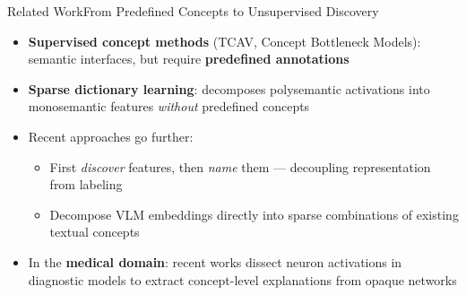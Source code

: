 \begin{frame}{Related Work}{From Predefined Concepts to Unsupervised Discovery}
  \begin{itemize}
    \item \textbf{Supervised concept methods} (TCAV, Concept Bottleneck Models): semantic interfaces, but require \textbf{predefined annotations}
    \item \textbf{Sparse dictionary learning}: decomposes polysemantic activations into monosemantic features \textit{without} predefined concepts
    \item Recent approaches go further:
    \begin{itemize}
      \item First \textit{discover} features, then \textit{name} them --- decoupling representation from labeling
      \item Decompose VLM embeddings directly into sparse combinations of existing textual concepts
    \end{itemize}
    \item In the \textbf{medical domain}: recent works dissect neuron activations in diagnostic models to extract concept-level explanations from opaque networks
  \end{itemize}

\end{frame}